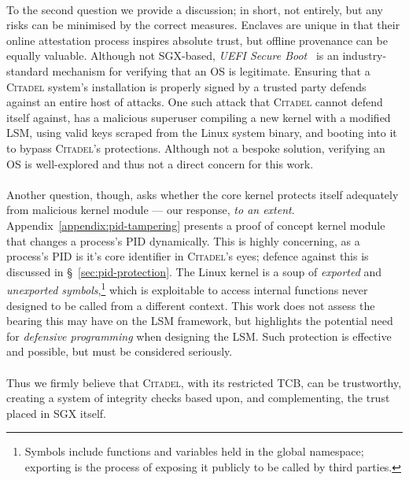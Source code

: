 \paragraph{} To the second question we provide a discussion; in short, not entirely, but any risks can be minimised by the correct measures. Enclaves are unique in that their online attestation process inspires absolute trust, but offline provenance can be equally valuable. Although not SGX-based, \textit{UEFI Secure Boot}~\cite{Richardson2013UefiSB} is an industry-standard mechanism for verifying that an OS is legitimate. Ensuring that a \textsc{Citadel} system's installation is properly signed by a trusted party defends against an entire host of attacks. One such attack that \textsc{Citadel} cannot defend itself against, has a malicious superuser compiling a new kernel with a modified LSM, using valid keys scraped from the Linux system binary, and booting into it to bypass \textsc{Citadel}'s protections. Although not a bespoke solution, verifying an OS is well-explored and thus not a direct concern for this work.

\paragraph{} Another question, though, asks whether the core kernel protects itself adequately from malicious kernel module --- our response, \textit{to an extent}. Appendix~\ref{appendix:pid-tampering} presents a proof of concept kernel module that changes a process's PID dynamically. This is highly concerning, as a process's PID is it's core identifier in \textsc{Citadel}'s eyes; defence against this is discussed in §~\ref{sec:pid-protection}. The Linux kernel is a soup of \textit{exported} and \textit{unexported symbols},\footnote{Symbols include functions and variables held in the global namespace; exporting is the process of exposing it publicly to be called by third parties.} which is exploitable to access internal functions never designed to be called from a different context. This work does not assess the bearing this may have on the LSM framework, but highlights the potential need for \textit{defensive programming} when designing the LSM. Such protection is effective and possible, but must be considered seriously.

\paragraph{} Thus we firmly believe that \textsc{Citadel}, with its restricted TCB, can be trustworthy, creating a system of integrity checks based upon, and complementing, the trust placed in SGX itself.

